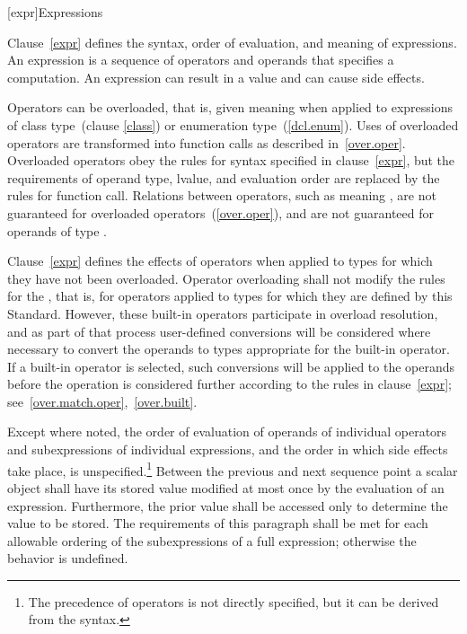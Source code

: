 [expr]{Expressions}


%
%
%
%
%
%
%

\pnum
{}%
\enternote 
Clause~\ref{expr} defines the syntax, order of evaluation, and meaning
of expressions.
An expression is a sequence of operators and operands that specifies a
computation. An expression can result in a value and can cause side
effects.

\pnum
{}%
Operators can be overloaded, that is, given meaning when applied to
expressions of class type~(clause \ref{class}) or enumeration
type~(\ref{dcl.enum}). Uses of overloaded operators are transformed into
function calls as described in~\ref{over.oper}. Overloaded operators
obey the rules for syntax specified in clause~\ref{expr}, but the
requirements of operand type, lvalue, and evaluation order are replaced
by the rules for function call. Relations between operators, such as
 meaning , are not guaranteed for overloaded
operators~(\ref{over.oper}), and are not guaranteed for operands of type
.
\exitnoteb

\pnum
Clause~\ref{expr} defines the effects of operators when applied to types
for which they have not been overloaded. Operator overloading shall not
modify the rules for the , that
is, for operators applied to types for which they are defined by this
Standard. However, these built-in operators participate in overload
resolution, and as part of that process user-defined conversions will be
considered where necessary to convert the operands to types appropriate
for the built-in operator. If a built-in operator is selected, such
conversions will be applied to the operands before the operation is
considered further according to the rules in clause~\ref{expr};
see~\ref{over.match.oper},~\ref{over.built}.

\pnum
Except where noted, the order of evaluation of operands of individual
operators and subexpressions of individual expressions, and the order
in which side effects take place, is unspecified.\footnote{The
precedence of operators is not directly specified, but it can be
derived from the syntax.} Between the previous and next sequence point
a scalar object shall have its stored value modified at most once by
the evaluation of an expression. Furthermore, the prior value shall be
accessed only to determine the value to be stored. The requirements of
this paragraph shall be met for each allowable ordering of the
subexpressions of a full expression; otherwise the behavior is undefined.
\enterexample

